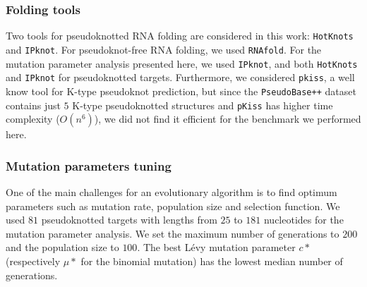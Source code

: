 \subsubsection*{Folding tools}
Two tools for pseudoknotted RNA folding are considered in this work: \texttt{HotKnots} and \texttt{IPknot}. For pseudoknot-free RNA folding, we used \texttt{RNAfold}.
For the mutation parameter analysis presented here, we used \texttt{IPknot}, and both \texttt{HotKnots} and \texttt{IPknot} for pseudoknotted targets. Furthermore, we considered \texttt{pkiss}, a well know tool for K-type pseudoknot prediction, but since the \texttt{PseudoBase++} dataset contains just $5$ K-type pseudoknotted structures and \texttt{pKiss} has higher time complexity ($O(n^6)$), we did not find it efficient for the benchmark we performed here. 
\subsubsection*{Mutation parameters tuning}
One of the main challenges for an evolutionary algorithm is to find optimum parameters such as mutation rate, population size and selection function.
We used $81$ pseudoknotted targets with lengths from $25$ to $181$ nucleotides for the mutation parameter analysis. We set the maximum number of generations to $200$ and the population size to $100$. The best Lévy mutation parameter $c*$ (respectively $\mu*$ for the binomial mutation) has the lowest median number of generations. 

